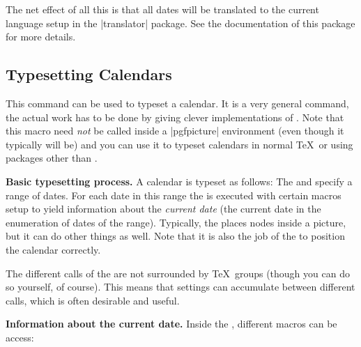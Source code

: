 The net effect of all this is that all dates will be translated to the
current language setup in the |translator| package. See the
documentation of this package for more details.



\subsection{Typesetting Calendars}

\begin{command}{\pgfcalendar{}}
  This command can be used to typeset a calendar. It is a very general
  command, the actual work has to be done by giving clever
  implementations of . Note that this macro need
  \emph{not} be called inside a |{pgfpicture}| environment (even
  though it typically will be) and you can use it to typeset calendars
  in normal \TeX\ or using packages other than \pgfname.

  \medskip
  \textbf{Basic typesetting process.}
  A calendar is typeset as follows: The  and
   specify a range of dates. For each date in this 
  range the  is executed with certain macros
  setup to yield information about the \emph{current date}
  (the current date in the enumeration of dates of the
  range). Typically, the  places nodes inside a
  picture, but it can do other things as well. Note that it is also
  the job of the  to position the calendar
  correctly. 

  The different calls of the  are not
  surrounded by \TeX\ groups (though you can do so yourself, of
  course). This means that settings can accumulate between different
  calls, which is often desirable and useful.

  \medskip
  \textbf{Information about the current date.}
  Inside the , different macros can be access:


\end{command}
